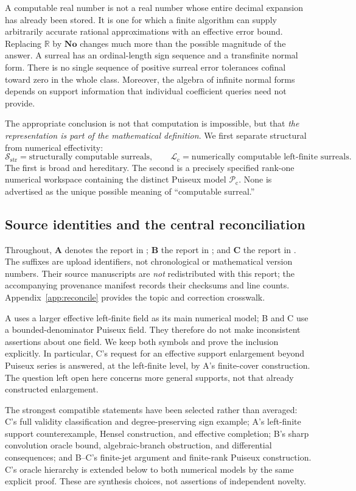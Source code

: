 \documentclass[11pt,letterpaper]{article}
\numberwithin{equation}{section}
\theoremstyle{definition}
\theoremstyle{remark}
\newcommand{\No}{\mathbf{No}}
\newcommand{\Sc}{\mathcal S_{\mathrm{str}}}
\newcommand{\Lc}{\mathcal L_{\mathrm c}}
\newcommand{\Pc}{\mathcal P_{\mathrm c}}
\newcommand{\R}{\mathbb R}
\begin{document}
A computable real number is not a real number whose entire decimal expansion
has already been stored. It is one for which a finite algorithm can supply
arbitrarily accurate rational approximations with an effective error bound.
Replacing $\R$ by $\No$ changes much more than the possible magnitude of the
answer. A surreal has an ordinal-length sign sequence and a transfinite
normal form. There is no single sequence of positive surreal error tolerances
cofinal toward zero in the whole class. Moreover, the algebra of infinite
normal forms depends on support information that individual coefficient
queries need not provide.

The appropriate conclusion is not that computation is impossible, but that
\emph{the representation is part of the mathematical definition}. We first separate structural from numerical effectivity:
\[
 \Sc=\text{structurally computable surreals},\qquad
 \Lc=\text{numerically computable left-finite surreals}.
\]
The first is broad and hereditary. The second is a precisely specified
rank-one numerical workspace containing the distinct Puiseux model $\Pc$.
None is advertised as the unique possible meaning of ``computable surreal.''


\subsection{Source identities and the central reconciliation}
Throughout, \textbf{A} denotes the report in
; \textbf{B} the report in
; and \textbf{C} the report in
. The suffixes are upload identifiers,
not chronological or mathematical version numbers. Their source manuscripts
are \emph{not} redistributed with this report; the accompanying provenance
manifest records their checksums and line counts.
Appendix~\ref{app:reconcile} provides the topic and correction crosswalk.

A uses a larger effective left-finite field as its main numerical model;
B and C use a bounded-denominator Puiseux field. They therefore do not make
inconsistent assertions about one field. We keep both symbols and prove the
inclusion explicitly. In particular, C's request for an effective support
enlargement beyond Puiseux series is answered, at the left-finite level, by
A's finite-cover construction. The question left open here concerns more
general supports, not that already constructed enlargement.

The strongest compatible statements have been selected rather than averaged:
C's full validity classification and degree-preserving sign example; A's
left-finite support counterexample, Hensel construction, and effective
completion; B's sharp convolution oracle bound, algebraic-branch obstruction,
and differential consequences; and B--C's finite-jet argument and finite-rank
Puiseux construction. C's oracle hierarchy is extended below to both numerical
models by the same explicit proof. These are synthesis choices, not assertions
of independent novelty.
\end{document}
